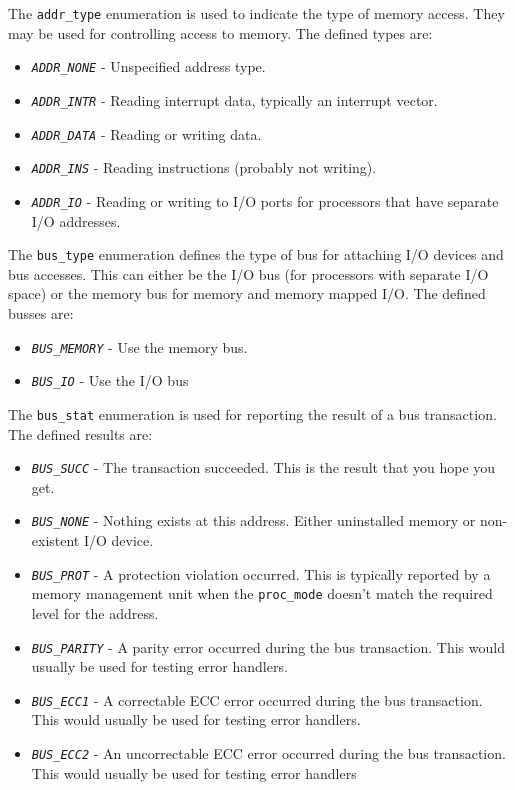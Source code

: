 \documentclass[10pt, openany]{book}
\newcommand{\constant}[1]{\emph{\texttt{#1}}}
\newcommand{\datatype}[1]{\texttt{#1}}
\begin{document}
The \datatype{addr\_type} enumeration is used to indicate the type of memory access.  They may be used for controlling access to memory.  The defined types are:
\begin{itemize}
  \item \constant{ADDR\_NONE} - Unspecified address type.
  \item \constant{ADDR\_INTR} - Reading interrupt data, typically an interrupt vector.
  \item \constant{ADDR\_DATA} - Reading or writing data.
  \item \constant{ADDR\_INS} - Reading instructions (probably not writing).
  \item \constant{ADDR\_IO} - Reading or writing to I/O ports for processors that have separate I/O addresses.
\end{itemize}

The \datatype{bus\_type} enumeration defines the type of bus for attaching I/O devices and bus accesses.  This can either be the I/O bus (for processors with separate I/O space) or the memory bus for memory and memory mapped I/O.  The defined busses are:
\begin{itemize}
  \item \constant{BUS\_MEMORY} - Use the memory bus.
  \item \constant{BUS\_IO} - Use the I/O bus
\end{itemize}

The \datatype{bus\_stat} enumeration is used for reporting the result of a bus transaction.  The defined results are:
\begin{itemize}
  \item \constant{BUS\_SUCC} - The transaction succeeded.  This is the result that you hope you get.
  \item \constant{BUS\_NONE} - Nothing exists at this address.  Either uninstalled memory or non-existent I/O device.
  \item \constant{BUS\_PROT} - A protection violation occurred.  This is typically reported by a memory management unit when the \datatype{proc\_mode} doesn't match the required level for the address.
  \item \constant{BUS\_PARITY} - A parity error occurred during the bus transaction.  This would usually be used for testing error handlers.
  \item \constant{BUS\_ECC1} - A correctable ECC error occurred during the bus transaction.  This would usually be used for testing error handlers.
  \item \constant{BUS\_ECC2} - An uncorrectable ECC error occurred during the bus transaction.  This would usually be used for testing error handlers
\end{itemize}
\end{document}
